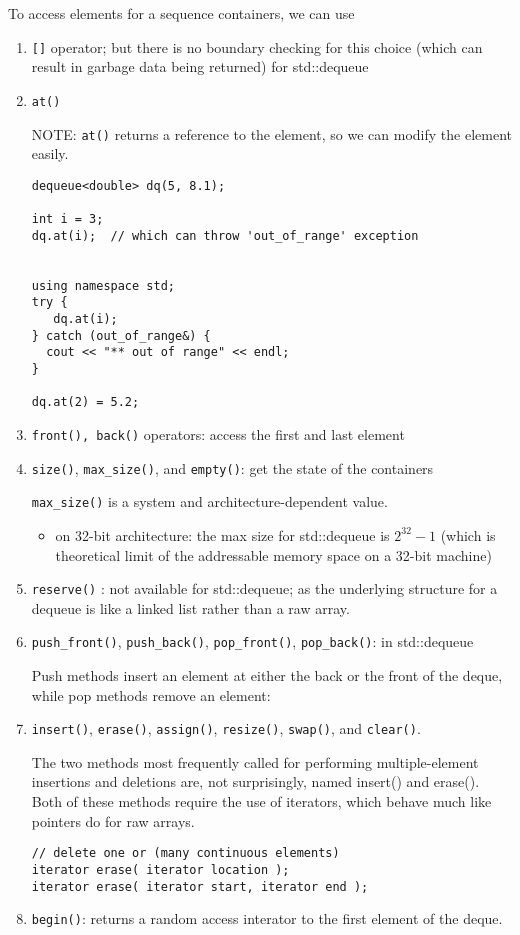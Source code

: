 To access elements for a sequence containers, we can use
\begin{enumerate}
  \item \verb![]! operator; but there is no boundary checking for this choice
  (which can result in garbage data being returned) for std::dequeue

  \item \verb!at()!

NOTE: \verb!at()! returns a reference to the element, so we can modify the
element easily. 
\begin{verbatim}
dequeue<double> dq(5, 8.1);

int i = 3;
dq.at(i);  // which can throw 'out_of_range' exception 


using namespace std;
try {
   dq.at(i);
} catch (out_of_range&) {
  cout << "** out of range" << endl;
}

dq.at(2) = 5.2;
\end{verbatim}  


  \item \verb!front(), back()! operators: access the first and last element

  \item \verb!size()!, \verb!max_size()!, and \verb!empty()!: get the state of
  the containers
  
  \verb!max_size()! is a system and architecture-dependent value. 
  \begin{itemize}
    \item on 32-bit architecture: the max size for std::dequeue is $2^{32}-1$ 
    (which is theoretical limit of the addressable memory space on a 32-bit
    machine)
  \end{itemize}
  
  \item \verb!reserve()! : not available for std::dequeue; as the underlying
  structure for a dequeue is like a linked list rather than a raw array.
  
  
  \item \verb!push_front()!, \verb!push_back()!, \verb!pop_front()!,
  \verb!pop_back()!: in std::dequeue
  
  
  Push methods insert an element at either the back or the front of the deque,
  while pop methods remove an element:
  
  \item \verb!insert()!, \verb!erase()!, \verb!assign()!, \verb!resize()!,
  \verb!swap()!, and \verb!clear()!.
  
  
  The two methods most frequently called for performing multiple-element
  insertions and deletions are, not surprisingly, named insert() and erase().
  Both of these methods require the use of iterators, which behave much like
  pointers do for raw arrays.   

\begin{verbatim}
// delete one or (many continuous elements)
iterator erase( iterator location );
iterator erase( iterator start, iterator end );
\end{verbatim}  
  
  \item \verb!begin()!:  returns a random access interator to the first element
  of the deque.
\end{enumerate}

